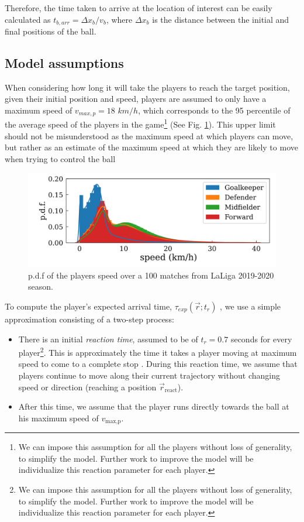 \documentclass[
  10pt,
  twoside,nohyper]{book}
\providecommand{\tightlist}{%
  \setlength{\itemsep}{0pt}\setlength{\parskip}{0pt}}
\begin{document}
Therefore, the time taken to arrive at the location of interest can be easily calculated as \(t_{b,arr} = \Delta x_b/v_b\), where \(\Delta x_b\) is the distance between the initial and final positions of the ball.

\subsection{Model assumptions}\label{model-assumptions}

When considering how long it will take the players to reach the target position, given their initial position and speed, players are assumed to only have a maximum speed of \(v_{max,p} = 18\) \(km/h\), which corresponds to the 95 percentile of the average speed of the players in the game\footnote{We can impose this assumption for all the players without loss of generality, to simplify the model. Further work to improve the model will be individualize this reaction parameter for each player.} \autocite{Spearman} (See Fig. \ref{fig:vel}). This upper limit should not be misunderstood as the maximum speed at which players can move, but rather as an estimate of the maximum speed at which they are likely to move when trying to control the ball

\begin{figure}[H]

{\centering \includegraphics[width=0.8\linewidth,]{imagenes/vel} 

}

\caption{p.d.f of the players speed over a 100 matches from LaLiga 2019-2020 season.}\label{fig:vel}
\end{figure}

To compute the player's expected arrival time, \(\tau_{exp}(\vec{r};t_r)\) , we use a simple approximation consisting of a two-step process:

\begin{itemize}
\tightlist
\item
  There is an initial \emph{reaction time}, assumed to be of \(t_{r} = 0.7\) seconds for every player\footnote{We can impose this assumption for all the players without loss of generality, to simplify the model. Further work to improve the model will be individualize this reaction parameter for each player.}. This is approximately the time it takes a player moving at maximum speed to come to a complete stop \autocite{Spearman}. During this reaction time, we assume that players continue to move along their current trajectory without changing speed or direction (reaching a position \(\vec{r}_{\text{react}}\)).
\item
  After this time, we assume that the player runs directly towards the ball at his maximum speed of \(v_{\text{max,p}}\).
\end{itemize}
\end{document}
